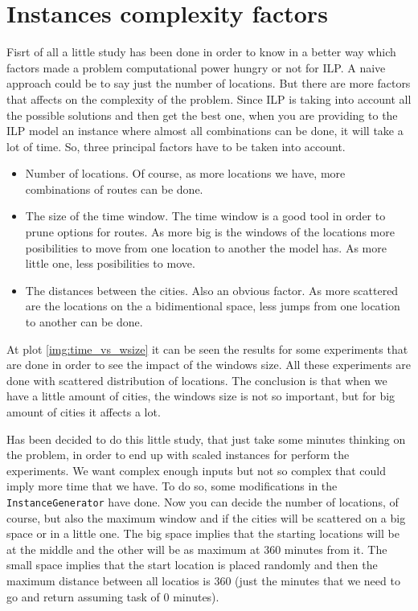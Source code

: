 \documentclass[]{report}
\begin{document}
\section{Instances complexity factors}\label{s:complexity_factors}

Fisrt of all a little study has been done in order to know in a better way which factors made a problem computational power hungry or not for ILP. A naive approach could be to say just the number of locations. But there are more factors that affects on the complexity of the problem. Since ILP is taking into account all the possible solutions and then get the best one, when you are providing to the ILP model an instance where almost all combinations can be done, it will take a lot of time. So, three principal factors have to be taken into account.

\begin{itemize}
	\item Number of locations. Of course, as more locations we have, more combinations of routes can be done.
	\item The size of the time window. The time window is a good tool in order to prune options for routes. As more big is the windows of the locations more posibilities to move from one location to another the model has. As more little one, less posibilities to move.
	\item The distances between the cities. Also an obvious factor. As more scattered are the locations on the a bidimentional space, less jumps from one location to another can be done.
\end{itemize}

At plot \ref{img:time_vs_wsize} it can be seen the results for some experiments that are done in order to see the impact of the windows size. All these experiments are done with scattered distribution of locations. The conclusion is that when we have a little amount of cities, the windows size is not so important, but for big amount of cities it affects a lot.

Has been decided to do this little study, that just take some minutes thinking on the problem, in order to end up with scaled instances for perform the experiments. We want complex enough inputs but not so complex that could imply more time that we have. To do so, some modifications in the {\tt InstanceGenerator} have done. Now you can decide the number of locations, of course, but also the maximum window and if the cities will be scattered on a big space or in a little one. The big space implies that the starting locations will be at the middle and the other will be as maximum at 360 minutes from it. The small space implies that the start location is placed randomly and then the maximum distance between all locatios is 360 (just the minutes that we need to go and return assuming task of 0 minutes).
\end{document}
